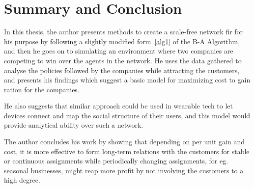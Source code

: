 
\chapter{Summary and Conclusion} %

\label{Chapter7} %


In this thesis, the author presents methods to create a scale-free network fir for his purpose by following a slightly modified form~\ref{alg1} of the B-A Algorithm, and then he goes on to simulating an environment where two companies are competing to win over the agents in the network.
He uses the data gathered to analyse the policies followed by the companies while attracting the customers, and presents his findings which suggest a basic model for maximizing cost to gain ration for the companies.

He also suggests that similar approach could be used in wearable tech to let devices connect and map the social structure of their users, and this model would provide analytical ability over such a network.

The author concludes his work by showing that depending on per unit gain and cost, it is more effective to form long-term relations with the customers for stable or continuous assignments while periodically changing assignments, for eg. seasonal businesses, might reap more profit by not involving the customers to a high degree.